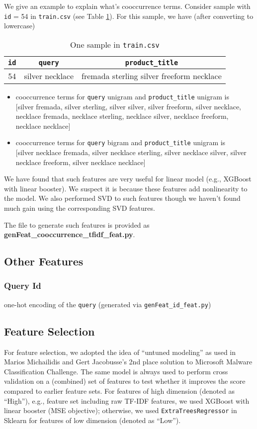 \documentclass[12pt]{article}
\begin{document}
We give an example to explain what's cooccurrence terms. Consider sample with \texttt{id} = 54 in \texttt{train.csv} (see Table \ref{tab:sample_id54}). For this sample, we have (after converting to lowercase)
\begin{table}[!htb]
\centering
\caption{One sample in \texttt{train.csv}}
\label{tab:sample_id54}
\begin{tabular}{|c|c|c|}
\hline
\texttt{id} & \texttt{query} & \texttt{product\_title} \\
\hline
54 & silver necklace & fremada sterling silver freeform necklace\\
\hline
\end{tabular}
\end{table}
\begin{itemize}
\item cooccurrence terms for \texttt{query} unigram and \texttt{product\_title} unigram is\\
$[$silver fremada, silver sterling, silver silver, silver freeform, silver necklace, necklace fremada, necklace sterling, necklace silver, necklace freeform, necklace necklace$]$
\item cooccurrence terms for \texttt{query} bigram and \texttt{product\_title} unigram is\\
$[$silver necklace fremada, silver necklace sterling, silver necklace silver, silver necklace freeform, silver necklace necklace$]$
\end{itemize}
We have found that such features are very useful for linear model (e.g., XGBoost with linear booster). We suspect it is because these features add nonlinearity to the model. We also performed SVD to such features though we haven't found much gain using the corresponding SVD features.

The file to generate such features is provided as \textbf{genFeat\_cooccurrence\_tfidf\_feat.py}.


\subsection{Other Features}
\subsubsection{Query Id}
one-hot encoding of the \texttt{query} (generated via \texttt{genFeat\_id\_feat.py})

\subsection{Feature Selection}
For feature selection, we adopted the idea of ``untuned modeling'' as used in Marios Michailidis and Gert Jacobusse's 2nd place solution \cite{malware_2nd} to Microsoft Malware Classification Challenge. The same model is always used to perform cross validation on a (combined) set of features to test whether it improves the
score compared to earlier feature sets. For features of high dimension (denoted as ``High''), e.g., feature set including raw TF-IDF features, we used XGBoost with linear booster (MSE objective); otherwise, we used \texttt{ExtraTreesRegressor} in Sklearn for features of low dimension (denoted as ``Low'').
\end{document}
